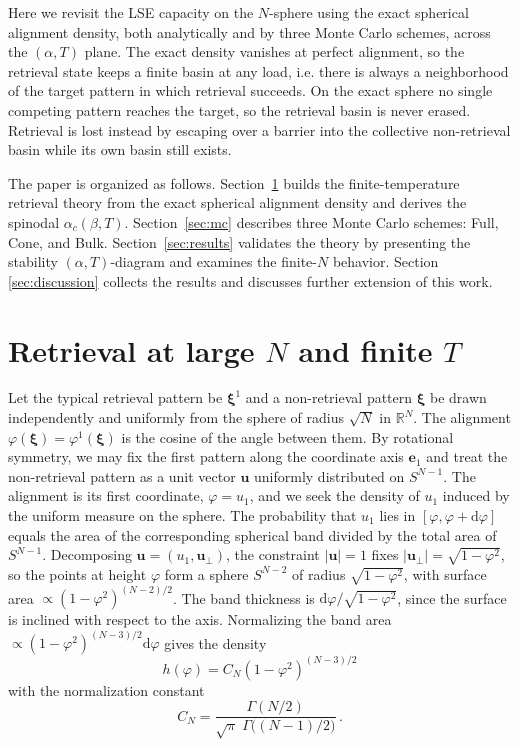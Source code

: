 \documentclass[letterpaper]{article} %
\newcommand{\bxi}{\boldsymbol{\xi}}
\newcommand{\dd}{{\mathrm{d}}}
\newcommand{\Bnet}{\beta}
\begin{document}
Here we revisit the LSE capacity on the $N$-sphere using the exact spherical alignment density, both analytically and by three Monte Carlo schemes, across the $(\alpha, T)$ plane. The exact density vanishes at perfect alignment, so the retrieval state keeps a finite basin at any load, i.e. there is always a neighborhood of the target pattern in which retrieval succeeds. On the exact sphere no single competing pattern reaches the target, so the retrieval basin is never erased. Retrieval is lost instead by escaping over a barrier into the collective non-retrieval basin while its own basin still exists.

The paper is organized as follows. Section~\ref{sec:theory} builds the
finite-temperature retrieval theory from the exact spherical alignment density and derives the spinodal $\alpha_c(\Bnet, T)$. Section~\ref{sec:mc} describes three
Monte Carlo schemes: Full, Cone, and Bulk. Section~\ref{sec:results} validates the theory by presenting the stability $(\alpha, T)$-diagram and examines the finite-$N$ behavior. Section \ref{sec:discussion} collects the results and discusses further extension of this work.



\section{Retrieval at large $N$ and finite $T$}
\label{sec:theory}

Let the typical retrieval pattern be $\bxi^1$ and a non-retrieval pattern $\bxi$ be drawn independently and uniformly from the sphere of radius $\sqrt N$ in $\mathbb{R}^N$. The alignment $\varphi(\bxi) = \varphi^1(\bxi)$ is the cosine of the angle between them.
By rotational symmetry, we may fix the first pattern along the coordinate axis $\bm e_1$ and treat the non-retrieval pattern as a unit vector $\bm u$ uniformly distributed on $S^{N-1}$. The alignment is its first coordinate, $\varphi=u_1$, and we seek the density of $u_1$ induced by the uniform measure on the sphere. The probability that $u_1$ lies in $[\varphi,\varphi+\dd\varphi]$ equals the area of the corresponding spherical band divided by the total area of $S^{N-1}$. Decomposing $\bm u=(u_1,\bm u_\perp)$, the constraint $|\bm u|=1$ fixes $|\bm u_\perp|=\sqrt{1-\varphi^2}$, so the points at height 
$\varphi$ form a sphere $S^{N-2}$ of radius $\sqrt{1-\varphi^2}$, with surface area $\propto (1-\varphi^2)^{(N-2)/2}$. The band thickness is $\dd\varphi/\sqrt{1-\varphi^2}$, since the surface is inclined with respect to the axis. Normalizing the band area
$\propto(1-\varphi^2)^{(N-3)/2}\dd\varphi$ gives the density
\begin{equation}
h(\varphi)=C_N(1-\varphi^2)^{(N-3)/2}
\label{eq:exact_density}
\end{equation}
with the normalization constant
\begin{equation}
C_N=\frac{\Gamma(N/2)}{\sqrt\pi\;\Gamma\!\big((N-1)/2\big)}\,.
\end{equation}
\end{document}
